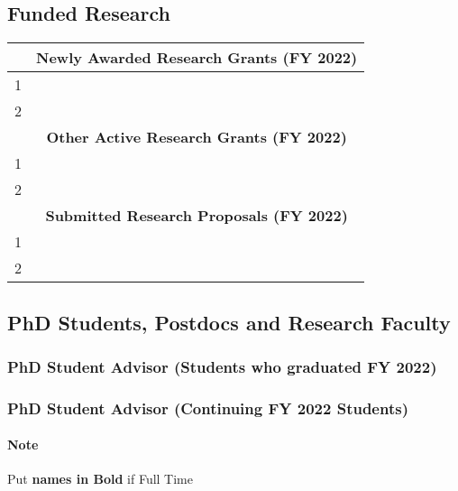 \documentclass[11pt]{article}
\newcommand{\fy}{2022}
\begin{document}
\subsection{Funded Research}


\begin{center}
  \begin{tabular}{cc}
    \toprule
    &\textbf{Newly Awarded Research Grants (FY \fy{})}\\
    \midrule
    1& \\
    2& \\
    \toprule
    &\textbf{Other Active Research Grants (FY \fy{})}\\
    \midrule
    1& \\
    2& \\
    &\textbf{Submitted Research Proposals (FY \fy{})}\\
    \midrule
    1& \\
    2& \\
    \bottomrule
  \end{tabular}
\end{center}

\subsection{PhD Students, Postdocs and Research Faculty}

\subsubsection{PhD Student Advisor (Students who graduated FY \fy{})}


\subsubsection{PhD Student Advisor (Continuing FY \fy{} Students)}
\paragraph{Note} Put \textbf{names in Bold} if Full Time
\end{document}
